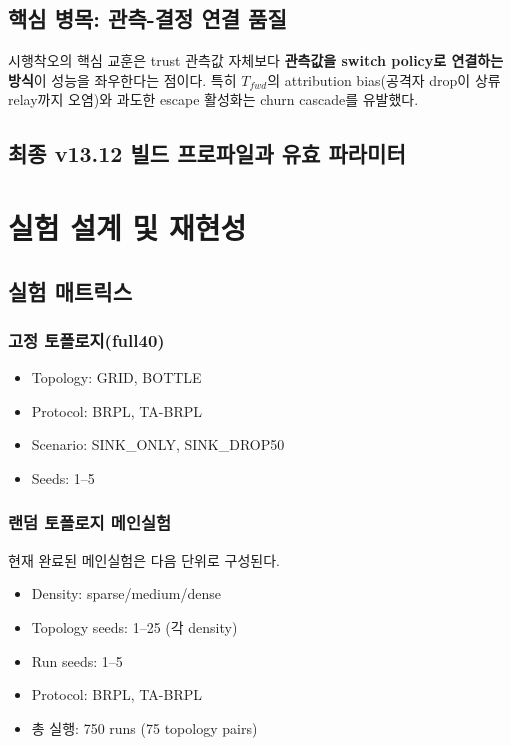 \documentclass[11pt,a4paper]{report}
\begin{document}
\section{핵심 병목: 관측-결정 연결 품질}
시행착오의 핵심 교훈은 trust 관측값 자체보다 \textbf{관측값을 switch policy로 연결하는 방식}이 성능을 좌우한다는 점이다.
특히 $T_{fwd}$의 attribution bias(공격자 drop이 상류 relay까지 오염)와 과도한 escape 활성화는 churn cascade를 유발했다.

\section{최종 v13.12 빌드 프로파일과 유효 파라미터}


\begingroup
\small

\endgroup

\chapter{실험 설계 및 재현성}
\section{실험 매트릭스}
\subsection*{고정 토폴로지(full40)}
\begin{itemize}
  \item Topology: GRID, BOTTLE
  \item Protocol: BRPL, TA-BRPL
  \item Scenario: SINK\_ONLY, SINK\_DROP50
  \item Seeds: 1--5
\end{itemize}

\subsection*{랜덤 토폴로지 메인실험}
현재 완료된 메인실험은 다음 단위로 구성된다.
\begin{itemize}
  \item Density: sparse/medium/dense
  \item Topology seeds: 1--25 (각 density)
  \item Run seeds: 1--5
  \item Protocol: BRPL, TA-BRPL
  \item 총 실행: 750 runs (75 topology pairs)
\end{itemize}
\end{document}
